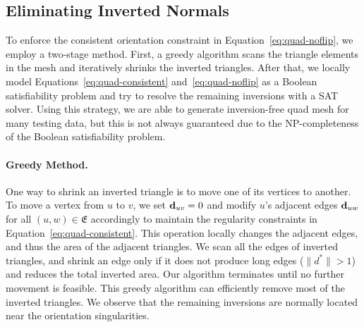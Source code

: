 \subsection{Eliminating Inverted Normals}
\label{sec:quad-flip}
To enforce the consistent orientation constraint in Equation~\eqref{eq:quad-noflip}, we employ a two-stage method.  First, a greedy algorithm scans the triangle elements in the mesh and iteratively shrinks the inverted triangles. After that, we locally model Equations~\eqref{eq:quad-consistent} and~\eqref{eq:quad-noflip} as a Boolean satisfiability problem and try to resolve the remaining inversions with a SAT solver.  Using this strategy, we are able to generate inversion-free quad mesh for many testing data, but this is not always guaranteed due to the NP-completeness of the Boolean satisfiability problem.

\paragraph*{Greedy Method.}
One way to shrink an inverted triangle is to move one of its vertices to another. To move a vertex from $u$ to $v$, we set ${\mathbf{d}}_{uv}=0$ and modify $u$'s adjacent edges ${\mathbf{d}}_{uw}$ for all $(u,w)\in\mathfrak{E}$ accordingly to maintain the regularity constraints in Equation~\eqref{eq:quad-consistent}.  This operation locally changes the adjacent edges, and thus the area of the adjacent triangles. We scan all the edges of inverted triangles, and shrink an edge only if it does not produce long edges ($\|d^*\|>1$) and reduces the total inverted area.  Our algorithm terminates until no further movement is feasible. This greedy algorithm can efficiently remove most of the inverted triangles. We observe that the remaining inversions are normally located near the orientation singularities.

